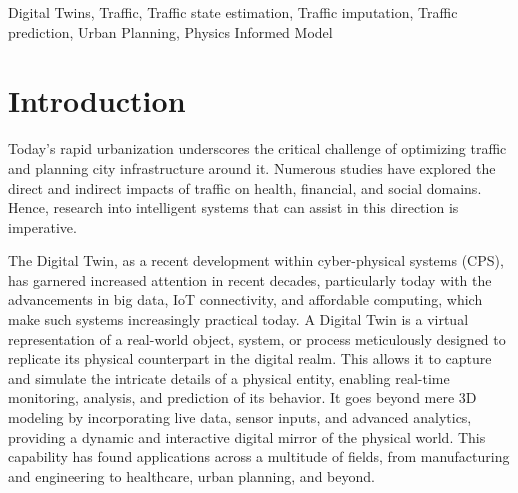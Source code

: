 \documentclass[conference]{IEEEtran}
\begin{document}
\begin{IEEEkeywords}
Digital Twins, Traffic, Traffic state estimation, Traffic imputation, Traffic prediction, Urban Planning, Physics Informed Model
\end{IEEEkeywords}

\section{Introduction}
Today's rapid urbanization underscores the critical challenge of optimizing traffic and planning city infrastructure around it. Numerous studies have explored the direct and indirect impacts of traffic on health\cite{levy2010evaluation}, financial\cite{gorea2016financial}, and social domains\cite{anciaes2017social}. Hence, research into intelligent systems that can assist in this direction is imperative.

The Digital Twin, as a recent development within cyber-physical systems (CPS), has garnered increased attention in recent decades\cite{guo2017mobile}\cite{singh2021digital}, particularly today with the advancements in big data, IoT connectivity, and affordable computing, which make such systems increasingly practical today. A Digital Twin is a virtual representation of a real-world object\cite{VANDERHORN2021113524}, system, or process meticulously designed to replicate its physical counterpart in the digital realm. This allows it to capture and simulate the intricate details of a physical entity, enabling real-time monitoring, analysis, and prediction of its behavior. It goes beyond mere 3D modeling by incorporating live data, sensor inputs, and advanced analytics, providing a dynamic and interactive digital mirror of the physical world\cite{VANDERHORN2021113524}. This capability has found applications across a multitude of fields, from manufacturing and engineering to healthcare, urban planning, and beyond.
\end{document}
